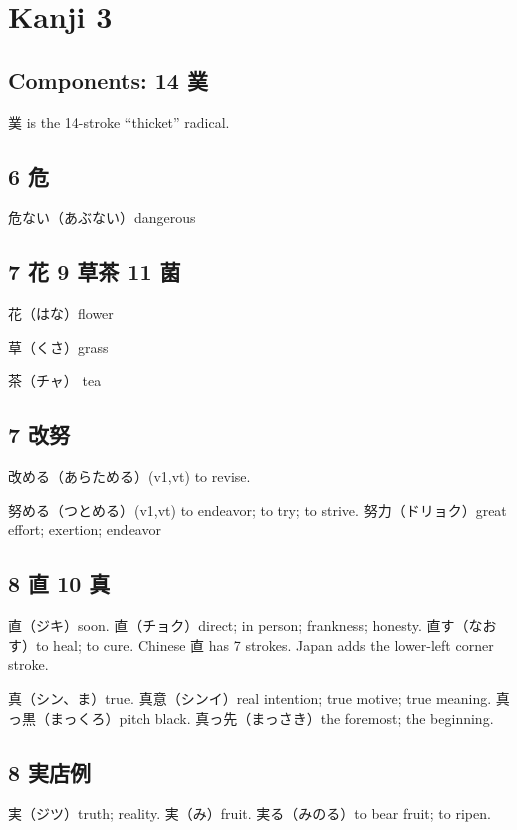 \chapter{Kanji 3}

\section{Components: 14 菐}

菐 is the 14-stroke ``thicket'' radical.

\section{6 危}

危ない（あぶない）dangerous

\section{7 花 9 草茶 11 菌}

花（はな）flower

草（くさ）grass

茶（チャ） tea

\section{7 改努}

改める（あらためる）(v1,vt) to revise.

努める（つとめる）(v1,vt) to endeavor; to try; to strive.
努力（ドリョク）great effort; exertion; endeavor

\section{8 直 10 真}

直（ジキ）soon.
直（チョク）direct; in person; frankness; honesty.
直す（なおす）to heal; to cure.
Chinese 直 has 7 strokes.
Japan adds the lower-left corner stroke.

真（シン、ま）true.
真意（シンイ）real intention; true motive; true meaning.
真っ黒（まっくろ）pitch black.
真っ先（まっさき）the foremost; the beginning.

\section{8 実店例}

実（ジツ）truth; reality.
実（み）fruit.
実る（みのる）to bear fruit; to ripen.


